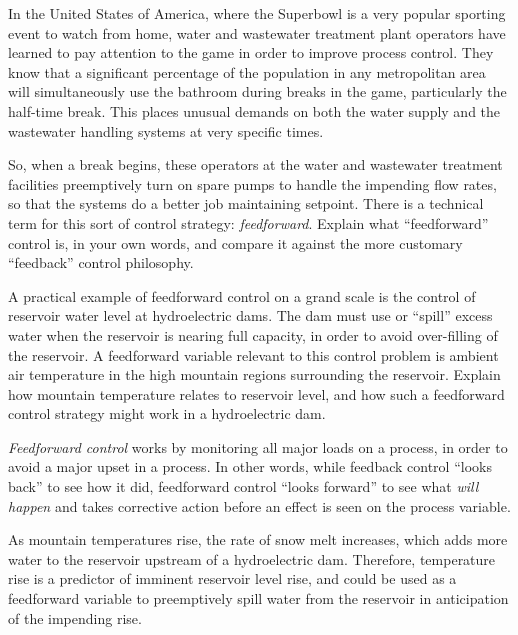 

In the United States of America, where the Superbowl is a very popular sporting event to watch from home, water and wastewater treatment plant operators have learned to pay attention to the game in order to improve process control.  They know that a significant percentage of the population in any metropolitan area will simultaneously use the bathroom during breaks in the game, particularly the half-time break.  This places unusual demands on both the water supply and the wastewater handling systems at very specific times.

So, when a break begins, these operators at the water and wastewater treatment facilities preemptively turn on spare pumps to handle the impending flow rates, so that the systems do a better job maintaining setpoint.  There is a technical term for this sort of control strategy: {\it feedforward}.  Explain what ``feedforward'' control is, in your own words, and compare it against the more customary ``feedback'' control philosophy.

\vskip 20pt

A practical example of feedforward control on a grand scale is the control of reservoir water level at hydroelectric dams.  The dam must use or ``spill'' excess water when the reservoir is nearing full capacity, in order to avoid over-filling of the reservoir.  A feedforward variable relevant to this control problem is ambient air temperature in the high mountain regions surrounding the reservoir.  Explain how mountain temperature relates to reservoir level, and how such a feedforward control strategy might work in a hydroelectric dam.














{\it Feedforward control} works by monitoring all major loads on a process, in order to avoid a major upset in a process.  In other words, while feedback control ``looks back'' to see how it did, feedforward control ``looks forward'' to see what {\it will happen} and takes corrective action before an effect is seen on the process variable.

\vskip 10pt

As mountain temperatures rise, the rate of snow melt increases, which adds more water to the reservoir upstream of a hydroelectric dam.  Therefore, temperature rise is a predictor of imminent reservoir level rise, and could be used as a feedforward variable to preemptively spill water from the reservoir in anticipation of the impending rise.




